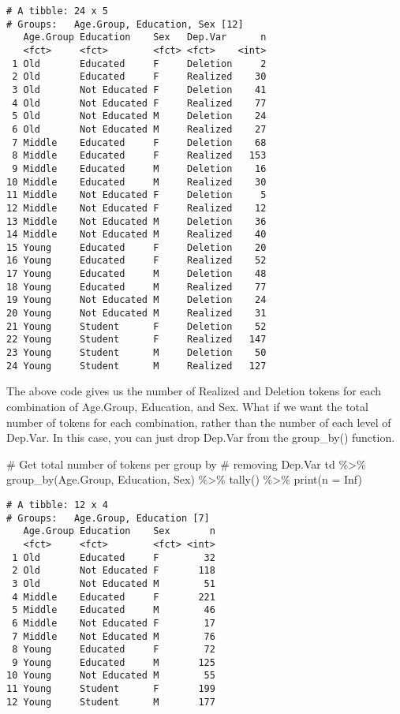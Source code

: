 \documentclass[
  12pt,
  letterpaper]{article}
\newenvironment{Shaded}{\begin{snugshade}}{\end{snugshade}}
\newcommand{\AttributeTok}[1]{\textcolor[rgb]{0.40,0.45,0.13}{#1}}
\newcommand{\CommentTok}[1]{\textcolor[rgb]{0.37,0.37,0.37}{#1}}
\newcommand{\ConstantTok}[1]{\textcolor[rgb]{0.56,0.35,0.01}{#1}}
\newcommand{\FunctionTok}[1]{\textcolor[rgb]{0.28,0.35,0.67}{#1}}
\newcommand{\NormalTok}[1]{\textcolor[rgb]{0.00,0.23,0.31}{#1}}
\newcommand{\SpecialCharTok}[1]{\textcolor[rgb]{0.37,0.37,0.37}{#1}}
\renewcommand\texttt[1]{{\ttfamily\color{BrickRed}#1}}
\begin{document}
\begin{verbatim}
# A tibble: 24 x 5
# Groups:   Age.Group, Education, Sex [12]
   Age.Group Education    Sex   Dep.Var      n
   <fct>     <fct>        <fct> <fct>    <int>
 1 Old       Educated     F     Deletion     2
 2 Old       Educated     F     Realized    30
 3 Old       Not Educated F     Deletion    41
 4 Old       Not Educated F     Realized    77
 5 Old       Not Educated M     Deletion    24
 6 Old       Not Educated M     Realized    27
 7 Middle    Educated     F     Deletion    68
 8 Middle    Educated     F     Realized   153
 9 Middle    Educated     M     Deletion    16
10 Middle    Educated     M     Realized    30
11 Middle    Not Educated F     Deletion     5
12 Middle    Not Educated F     Realized    12
13 Middle    Not Educated M     Deletion    36
14 Middle    Not Educated M     Realized    40
15 Young     Educated     F     Deletion    20
16 Young     Educated     F     Realized    52
17 Young     Educated     M     Deletion    48
18 Young     Educated     M     Realized    77
19 Young     Not Educated M     Deletion    24
20 Young     Not Educated M     Realized    31
21 Young     Student      F     Deletion    52
22 Young     Student      F     Realized   147
23 Young     Student      M     Deletion    50
24 Young     Student      M     Realized   127
\end{verbatim}

The above code gives us the number of \texttt{Realized} and
\texttt{Deletion} tokens for each combination of \texttt{Age.Group},
\texttt{Education}, and \texttt{Sex}. What if we want the total number
of tokens for each combination, rather than the number of each level of
\texttt{Dep.Var}. In this case, you can just drop \texttt{Dep.Var} from
the \texttt{group\_by()} function.

\begin{Shaded}
\begin{Highlighting}[]
\CommentTok{\# Get total number of tokens per group by}
\CommentTok{\# removing Dep.Var}
\NormalTok{td }\SpecialCharTok{\%\textgreater{}\%}
    \FunctionTok{group\_by}\NormalTok{(Age.Group, Education, Sex) }\SpecialCharTok{\%\textgreater{}\%}
    \FunctionTok{tally}\NormalTok{() }\SpecialCharTok{\%\textgreater{}\%}
    \FunctionTok{print}\NormalTok{(}\AttributeTok{n =} \ConstantTok{Inf}\NormalTok{)}
\end{Highlighting}
\end{Shaded}

\begin{verbatim}
# A tibble: 12 x 4
# Groups:   Age.Group, Education [7]
   Age.Group Education    Sex       n
   <fct>     <fct>        <fct> <int>
 1 Old       Educated     F        32
 2 Old       Not Educated F       118
 3 Old       Not Educated M        51
 4 Middle    Educated     F       221
 5 Middle    Educated     M        46
 6 Middle    Not Educated F        17
 7 Middle    Not Educated M        76
 8 Young     Educated     F        72
 9 Young     Educated     M       125
10 Young     Not Educated M        55
11 Young     Student      F       199
12 Young     Student      M       177
\end{verbatim}
\end{document}
